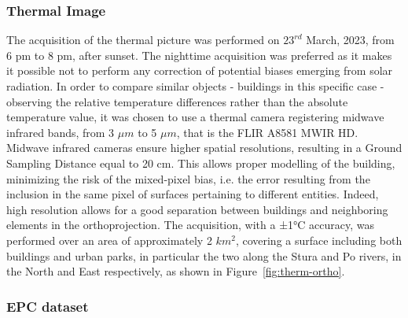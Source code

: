 \documentclass[preprint,12pt]{elsarticle}
\begin{document}
    \subsubsection{Thermal Image}\label{sec:therm}%
        The acquisition of the thermal picture was performed on $23^{rd}$ March, 2023, from 6 pm to 8 pm, after sunset. The nighttime acquisition was preferred as it makes it possible not to perform any correction of potential biases emerging from solar radiation. In order to compare similar objects - buildings in this specific case - observing the relative temperature differences rather than the absolute temperature value, it was chosen to use a thermal camera registering midwave infrared bands, from 3 $\mu m$ to 5 $\mu m$, that is the FLIR A8581 MWIR HD. Midwave infrared cameras ensure higher spatial resolutions, resulting in a Ground Sampling Distance equal to 20 cm. This allows proper modelling of the building, minimizing the risk of the mixed-pixel bias, i.e. the error resulting from the inclusion in the same pixel of surfaces pertaining to different entities. Indeed, high resolution allows for a good separation between buildings and neighboring elements in the orthoprojection. The acquisition, with a ±1°C accuracy, was performed over an area of approximately 2 $km^2$, covering a surface including both buildings and urban parks, in particular the two along the Stura and Po rivers, in the North and East respectively, as shown in Figure~\ref{fig:therm-ortho}.
        

    \subsubsection{EPC dataset}
\end{document}
